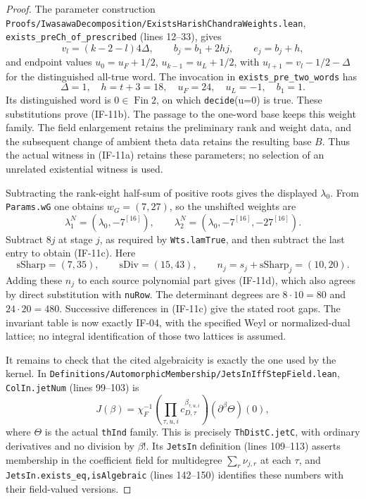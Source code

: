 \begin{proof}
The parameter construction
\texttt{Proofs/IwasawaDecomposition/ExistsHarishChandraWeights.lean},
\texttt{exists\_preCh\_of\_prescribed} (lines 12--33), gives
\[
 v_l=(k-2-l)4\Delta,\qquad
 b_j=b_1+2hj,\qquad e_j=b_j+h,
\]
and endpoint values $u_0=u_F+1/2$, $u_{k-1}=u_L+1/2$, with
$u_{l+1}=v_l-1/2-\Delta$ for the distinguished all-true word.
The invocation in \texttt{exists\_pre\_two\_words} has
\[
 \Delta=1,\quad h=t+3=18,\quad u_F=24,\quad u_L=-1,
 \quad b_1=1.
\]
Its distinguished word is $0\in\operatorname{Fin}2$, on which
\texttt{decide}(u=0) is true. These substitutions prove (IF-11b).
The passage to the one-word base keeps this weight family. The field
enlargement retains the preliminary rank and weight data, and the
subsequent change of ambient theta data retains the resulting base $B$. Thus the actual witness in (IF-11a) retains these
parameters; no selection of an unrelated existential witness is used.

Subtracting the rank-eight half-sum of positive roots gives the
displayed $\lambda_0$. From \texttt{Params.wG} one obtains
$w_G=(7,27)$, so the unshifted weights are
\[
 \lambda^N_1=(\lambda_0,-7^{[16]}),\qquad
 \lambda^N_2=(\lambda_0,-7^{[16]},-27^{[16]}).
\]
Subtract $8j$ at stage $j$, as required by
\texttt{Wts.lamTrue}, and then subtract the last entry to obtain
(IF-11c). Here
\[
 \mathrm{sSharp}=(7,35),\qquad
 \mathrm{sDiv}=(15,43),\qquad
 n_j=s_j+\mathrm{sSharp}_j=(10,20).
\]
Adding these $n_j$ to each source polynomial part gives (IF-11d),
which also agrees by direct substitution with \texttt{nuRow}.
The determinant degrees are $8\cdot10=80$ and $24\cdot20=480$.
Successive differences in (IF-11c) give the stated root gaps.
The invariant table is now exactly IF-04, with the specified Weyl
or normalized-dual lattice; no integral identification of those two
lattices is assumed.

It remains to check that the cited algebraicity is exactly the one
used by the kernel. In
\texttt{Definitions/AutomorphicMembership/JetsInIffStepField.lean},
\texttt{ColIn.jetNum} (lines 99--103) is
\[
 J(\beta)=\chi_F^{-1}
       \left(\prod_{\tau,u,i}c_{D,\tau}^{\beta_{\tau,u,i}}\right)
       (\partial^\beta\Theta)(0),                 \tag{IF-11f}
\]
where $\Theta$ is the actual \texttt{thInd} family. This is precisely
\texttt{ThDistC.jetC}, with ordinary derivatives and no division by
$\beta!$. Its \texttt{JetsIn} definition (lines 109--113) asserts
membership in the coefficient field for multidegree
$\sum_r\nu_{j,r}$ at each $\tau$, and
\texttt{JetsIn.exists\_eq,isAlgebraic} (lines 142--150) identifies
these numbers with their field-valued versions.


\end{proof}
